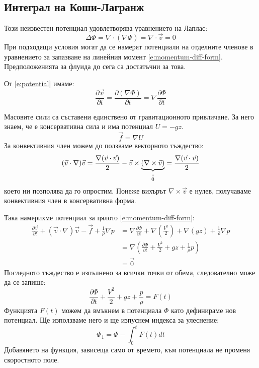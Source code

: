 \documentclass[12pt]{article}
\numberwithin{equation}{section}
\newcommand{\vel}{\vec{v}}
\newcommand{\DefineAs}[2]{\underset{\overset{\shortparallel}{#2}}{\underbrace{#1}}}
\begin{document}
\subsection{Интеграл на Коши-Лагранж}
Този неизвестен потенциал удовлетворява уравнението на Лаплас:
\begin{equation}
    \label{e:Laplase}
    \Delta\Phi = \nabla\cdot(\nabla\Phi) = \nabla\cdot\vel = 0
\end{equation}
При подходящи условия могат да се намерят потенциали на отделните членове в уравнението за запазване на линейния момент \autoref{e:momentum-diff-form}. Предположенията за флуида до сега са достатъчни за това.

От \autoref{e:potential} имаме:
\begin{equation}
    \frac{\partial\vel}{\partial t} = \frac{\partial (\nabla\Phi)}{\partial t} = \nabla\frac{\partial\Phi}{\partial t}
\end{equation}

Масовите сили са съставени единствено от гравитационното привличане. За него знаем, че е консервативна сила и има потенциал $U=-gz$.
\begin{equation}
    \vec{f}=\nabla U
\end{equation}
За конвективния член можем до ползваме векторното тъждество:
\begin{equation}
    (\vel\cdot\nabla)\vel=\frac{\nabla(\vel\cdot\vel)}{2}-\vel\times\DefineAs{(\nabla\times\vel)}{0} = \frac{\nabla(\vel\cdot\vel)}{2}
\end{equation}
което ни позполява да го опростим. Понеже вихърът $\nabla\times\vel$ е нулев, получаваме конвективния член в консервативна форма.

Така намерихме потенциал за цялото \autoref{e:momentum-diff-form}:
\begin{equation}
    \begin{aligned}
        \frac{\partial\vel}{\partial t} + (\vel\cdot\nabla)\vel-\vec{f}+\frac{1}{\rho}\nabla p &= \nabla\frac{\partial \Phi}{\partial t} + \nabla\left(\frac{V^2}{2}\right) + \nabla(gz) + \frac{1}{\rho}\nabla p \\
        &= \nabla\left(\frac{\partial \Phi}{\partial t} + \frac{V^2}{2} + gz + \frac{1}{\rho} p\right) \\
        &=\vec{0}
    \end{aligned}
\end{equation}
Последното тъждество е изпълнено за всички точки от обема, следователно може да се запише:
\begin{equation}
    \frac{\partial \Phi}{\partial t} + \frac{V^2}{2} + gz + \frac{p}{\rho} = F(t)
\end{equation}
Функцията $F(t)$ можем да вмъкнем в потенциала $\Phi$ като дефинираме нов потенциал. Ще използваме него и ще изпуснем индекса за улеснение:
\begin{equation}
    \Phi_1=\Phi-\int_0^t F(t)dt
\end{equation}
Добавянето на функция, зависеща само от времето, към потенциала не променя скоростното поле.
\end{document}
